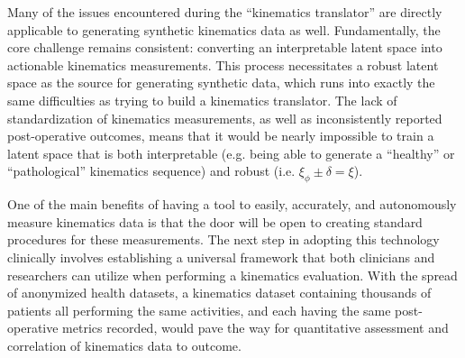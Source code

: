 Many of the issues encountered during the ``kinematics translator'' are directly applicable to generating synthetic kinematics data as well.
Fundamentally, the core challenge remains consistent: converting an interpretable latent space into actionable kinematics measurements.
This process necessitates a robust latent space as the source for generating synthetic data, which runs into exactly the same difficulties as trying to build a kinematics translator.
The lack of standardization of kinematics measurements, as well as inconsistently reported post-operative outcomes, means that it would be nearly impossible to train a latent space that is both interpretable (e.g. being able to generate a ``healthy'' or ``pathological'' kinematics sequence) and robust (i.e. $\xi_{\phi} \pm \delta = \xi$).

One of the main benefits of having a tool to easily, accurately, and autonomously measure kinematics data is that the door will be open to creating standard procedures for these measurements.
The next step in adopting this technology clinically involves establishing a universal framework that both clinicians and researchers can utilize when performing a kinematics evaluation.
With the spread of anonymized health datasets, a kinematics dataset containing thousands of patients all performing the same activities, and each having the same post-operative metrics recorded, would pave the way for quantitative assessment and correlation of kinematics data to outcome.

